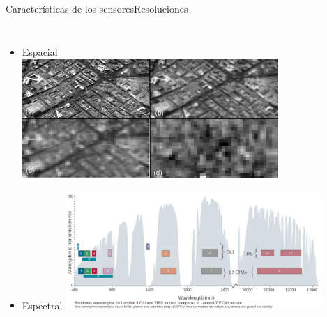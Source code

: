 \documentclass{beamer}
\begin{document}
\begin{frame}{Características de los sensores}{Resoluciones}
	\begin{columns}[t]
		\begin{itemize}
			\item Espacial \\
			\includegraphics[width=0.8\textwidth]{IMGs/res_esp}
			\item Espectral
			\includegraphics[width=0.8\textwidth]{IMGs/res_spectral}
		\end{itemize}
		\begin{itemize}


\end{itemize}
\end{columns}
\end{frame}
\end{document}
